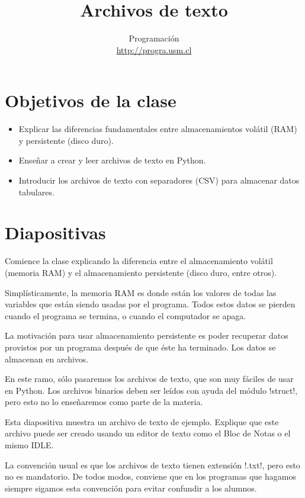 \documentclass[10pt]{article}
\title{Archivos de texto}
\author{Programación \\ \url{http://progra.usm.cl}}
\date{}
\begin{document}
  \maketitle

  \section*{Objetivos de la clase}
  \begin{itemize}
    \item Explicar las diferencias fundamentales
      entre almacenamientos volátil (RAM) y persistente (disco duro).
    \item Enseñar a crear y leer archivos de texto en Python.
    \item Introducir los archivos de texto con separadores (CSV)
      para almacenar datos tabulares.
  \end{itemize}

  \section*{Diapositivas}

  Comience la clase explicando la diferencia entre el almacenamiento volátil
  (memoria RAM) y el almacenamiento persistente (disco duro, entre otros).

  Simplísticamente, la memoria RAM es donde están los valores de todas las variables
  que están siendo usadas por el programa.
  Todos estos datos se pierden cuando el programa se termina,
  o cuando el computador se apaga.

  La motivación para usar almacenamiento persistente
  es poder recuperar datos provistos por un programa
  después de que éste ha terminado.
  Los datos se almacenan en archivos.

  En este ramo,
  sólo pasaremos los archivos de texto,
  que son muy fáciles de usar en Python.
  Los archivos binarios deben ser leídos con ayuda del módulo \li!struct!,
  pero esto no lo enseñaremos como parte de la materia.


  Esta diapositiva muestra un archivo de texto de ejemplo.
  Explique que este archivo puede ser creado
  usando un editor de texto como el Bloc de Notas
  o el mismo IDLE.

  La convención usual es que los archivos de texto tienen extensión \li!.txt!,
  pero esto no es mandatorio.
  De todos modos, conviene que en los programas que hagamos
  siempre sigamos esta convención
  para evitar confundir a los alumnos.
\end{document}
